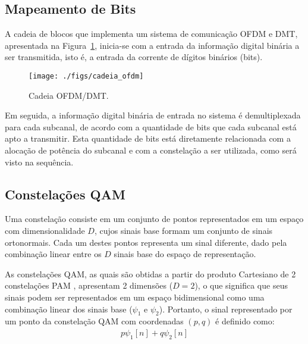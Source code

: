 \subsection{Mapeamento de Bits}

A cadeia de blocos que implementa um sistema de comunicação OFDM e DMT, apresentada na Figura~\ref{fig:cadeia_ofdm}, inicia-se com a entrada da informação digital binária a ser transmitida, isto é, a entrada da corrente de dígitos binários (bits).

\begin{figure}[htbp]
\centering
\texttt{[image: ./figs/cadeia\_ofdm]}
\caption{Cadeia OFDM/DMT.
\label{fig:cadeia_ofdm}}
\end{figure}

Em seguida, a informação digital binária de entrada no sistema é demultiplexada para cada subcanal, de acordo com a quantidade de bits que cada subcanal está apto a transmitir. Esta quantidade de bits está diretamente relacionada com a alocação de potência do subcanal e com a constelação a ser utilizada, como será visto na sequência.

\subsection{Constelações QAM}

Uma constelação consiste em um conjunto de pontos representados em um espaço com dimensionalidade $D$, cujos sinais base formam um conjunto de sinais ortonormais. Cada um destes pontos representa um sinal diferente, dado pela combinação linear entre os $D$ sinais base do espaço de representação. 

As constelações QAM, as quais são obtidas a partir do produto Cartesiano de 2 constelações PAM \cite{ee379a}, apresentam 2 dimensões ($D=2$), o que significa que seus sinais podem ser representados em um espaço bidimensional como uma combinação linear dos sinais base ($\psi_1$ e $\psi_2$). Portanto, o sinal representado por um ponto da constelação QAM com coordenadas $(p,q)$ é definido como:
\begin{align}
p\psi_1[n] +  q\psi_2[n]
\label{eq:constelacao}
\end{align}

